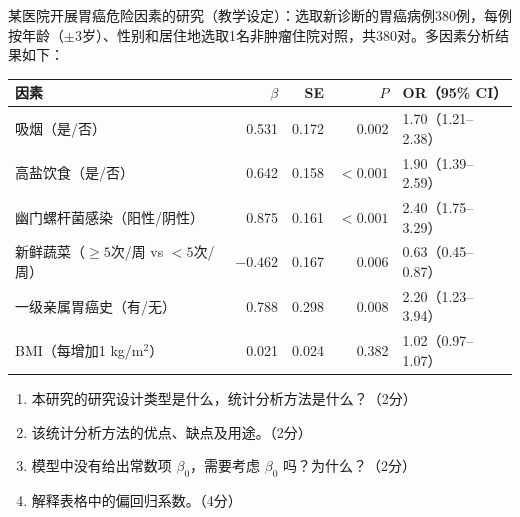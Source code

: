 \par\addvspace{8pt}\noindent\begin{minipage}{\linewidth}


某医院开展胃癌危险因素的研究（教学设定）：选取新诊断的胃癌病例380例，每例按年龄（\(\pm3\)岁）、性别和居住地选取1名非肿瘤住院对照，共380对。多因素分析结果如下：

\begin{center}\small\setlength{\tabcolsep}{4pt}\renewcommand{\arraystretch}{1.22}\begin{tabular}{@{}lrrrl@{}}
\toprule
因素 & \(\beta\) & SE & \(P\) & OR（95\% CI） \\
\midrule
吸烟（是/否） & 0.531 & 0.172 & 0.002 & 1.70（1.21--2.38） \\
高盐饮食（是/否） & 0.642 & 0.158 & \(<0.001\) & 1.90（1.39--2.59） \\
幽门螺杆菌感染（阳性/阴性） & 0.875 & 0.161 & \(<0.001\) & 2.40（1.75--3.29） \\
新鲜蔬菜（\(\ge5\)次/周 vs \(<5\)次/周） & \(-0.462\) & 0.167 & 0.006 & 0.63（0.45--0.87） \\
一级亲属胃癌史（有/无） & 0.788 & 0.298 & 0.008 & 2.20（1.23--3.94） \\
BMI（每增加1 kg/m\(^2\)） & 0.021 & 0.024 & 0.382 & 1.02（0.97--1.07） \\
\bottomrule\end{tabular}\end{center}

\begin{enumerate}
\def\labelenumi{\arabic{enumi}.}
\tightlist
\item
  本研究的研究设计类型是什么，统计分析方法是什么？（2分）
\item
  该统计分析方法的优点、缺点及用途。（2分）
\item
  模型中没有给出常数项 \(\beta_0\)，需要考虑 \(\beta_0\) 吗？为什么？（2分）
\item
  解释表格中的偏回归系数。（4分）
\end{enumerate}


\end{minipage}\par\vspace{5pt}

